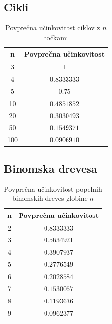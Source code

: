 \documentclass[a4paper, 16pt]{article}
\begin{document}
\newpage

    \subsection{Cikli}
    \begin{table}[!h]
        \begin{tabular}{c|c}
            n & Povprečna učinkovitost \\ \hline
            3   & $1$ \\
            4   & $0.8333333$ \\
            5   & $0.75$ \\
            10  & $0.4851852$ \\
            20  & $0.3030493$ \\
            50  & $0.1549371$ \\
            100 & $0.0906910$ \\

        \end{tabular}
        \caption{Povprečna učinkovitost ciklov z $n$ točkami}
        \label{table: 4}
    \end{table}

    \subsection{Binomska drevesa}
    \begin{table}[!h]
        \begin{tabular}{c|c}
            n & Povprečna učinkovitost \\ \hline
            2  & $0.8333333$ \\
            3  & $0.5634921$ \\
            4  & $0.3907937$ \\
            5  & $0.2776549$ \\
            6  & $0.2028584$ \\
            7  & $0.1530067$ \\
            8  & $0.1193636$ \\
            9  & $0.0962377$ 

        \end{tabular}
        \caption{Povprečna učinkovitost popolnih binomskih dreves globine $n$}
        \label{table: 5}
    \end{table}
\end{document}
